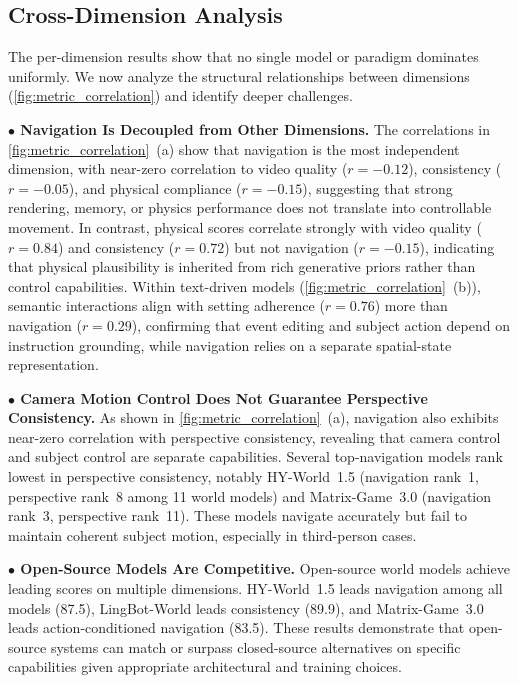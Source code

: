 \documentclass{llmxive}
\providecommand{\myparagraph}[1]{\vspace{-0.1em}\noindent\textbf{#1}\hspace{0.3em}}
\begin{document}
\subsection{Cross-Dimension Analysis}
\label{sec:cross_dimension}

The per-dimension results show that no single model or paradigm dominates uniformly. We now analyze the structural relationships between dimensions (\cref{fig:metric_correlation}) and identify deeper challenges.

\myparagraph{$\bullet$ Navigation Is Decoupled from Other Dimensions.}
The correlations in \cref{fig:metric_correlation}~(a) show that navigation is the most independent dimension, with near-zero correlation to video quality ($r{=}{-}0.12$), consistency ($r{=}{-}0.05$), and physical compliance ($r{=}{-}0.15$), suggesting that strong rendering, memory, or physics performance does not translate into controllable movement. In contrast, physical scores correlate strongly with video quality ($r{=}0.84$) and consistency ($r{=}0.72$) but not navigation ($r{=}{-}0.15$), indicating that physical plausibility is inherited from rich generative priors rather than control capabilities. Within text-driven models (\cref{fig:metric_correlation}~(b)), semantic interactions align with setting adherence ($r{=}0.76$) more than navigation ($r{=}0.29$), confirming that event editing and subject action depend on instruction grounding, while navigation relies on a separate spatial-state representation.

\myparagraph{$\bullet$ Camera Motion Control Does Not Guarantee Perspective Consistency.}
As shown in \cref{fig:metric_correlation}~(a), navigation also exhibits near-zero correlation with perspective consistency, revealing that camera control and subject control are separate capabilities. Several top-navigation models rank lowest in perspective consistency, notably HY-World~1.5 (navigation rank~1, perspective rank~8 among 11 world models) and Matrix-Game~3.0 (navigation rank~3, perspective rank~11). These models navigate accurately but fail to maintain coherent subject motion, especially in third-person cases.

\myparagraph{$\bullet$ Open-Source Models Are Competitive.}
Open-source world models achieve leading scores on multiple dimensions. HY-World~1.5 leads navigation among all models (87.5), LingBot-World leads consistency (89.9), and Matrix-Game~3.0 leads action-conditioned navigation (83.5). These results demonstrate that open-source systems can match or surpass closed-source alternatives on specific capabilities given appropriate architectural and training choices.
\end{document}
